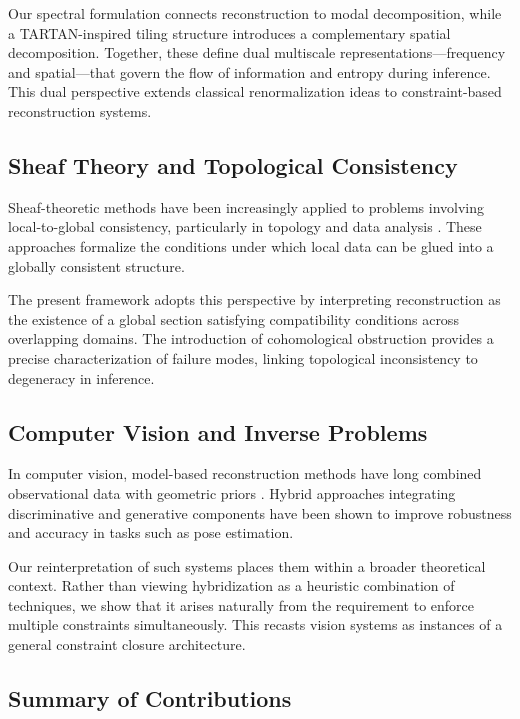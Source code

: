\documentclass[12pt]{article}
\begin{document}
Our spectral formulation connects reconstruction to modal decomposition, while a TARTAN-inspired tiling structure introduces a complementary spatial decomposition. Together, these define dual multiscale representations---frequency and spatial---that govern the flow of information and entropy during inference. This dual perspective extends classical renormalization ideas to constraint-based reconstruction systems.

\subsection{Sheaf Theory and Topological Consistency}

Sheaf-theoretic methods have been increasingly applied to problems involving local-to-global consistency, particularly in topology and data analysis \cite{kashiwara2006, ghrist2014}. These approaches formalize the conditions under which local data can be glued into a globally consistent structure.

The present framework adopts this perspective by interpreting reconstruction as the existence of a global section satisfying compatibility conditions across overlapping domains. The introduction of cohomological obstruction provides a precise characterization of failure modes, linking topological inconsistency to degeneracy in inference.

\subsection{Computer Vision and Inverse Problems}

In computer vision, model-based reconstruction methods have long combined observational data with geometric priors \cite{szeliski2010, hartley2004}. Hybrid approaches integrating discriminative and generative components have been shown to improve robustness and accuracy in tasks such as pose estimation.

Our reinterpretation of such systems places them within a broader theoretical context. Rather than viewing hybridization as a heuristic combination of techniques, we show that it arises naturally from the requirement to enforce multiple constraints simultaneously. This recasts vision systems as instances of a general constraint closure architecture.

\subsection{Summary of Contributions}
\end{document}
